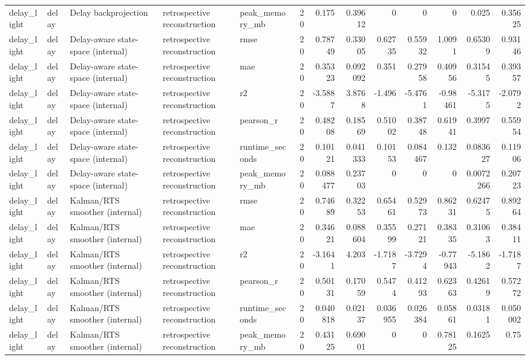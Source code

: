 \begin{table}[!htbp]
{{\begin{tabular}{lllllrrrrrrrr}
delay_light & delay & Delay backprojection & retrospective reconstruction & peak_memory_mb & 20 & 0.175 & 0.39612 & 0 & 0 & 0 & 0.025 & 0.35625 \\
delay_light & delay & Delay-aware state-space (internal) & retrospective reconstruction & rmse & 20 & 0.78749 & 0.33005 & 0.62735 & 0.55932 & 1.0091 & 0.65309 & 0.93146 \\
delay_light & delay & Delay-aware state-space (internal) & retrospective reconstruction & mae & 20 & 0.35323 & 0.092092 & 0.351 & 0.27958 & 0.40956 & 0.31545 & 0.39357 \\
delay_light & delay & Delay-aware state-space (internal) & retrospective reconstruction & r2 & 20 & -3.5887 & 3.8768 & -1.496 & -5.4761 & -0.98461 & -5.3175 & -2.0792 \\
delay_light & delay & Delay-aware state-space (internal) & retrospective reconstruction & pearson_r & 20 & 0.48208 & 0.18569 & 0.51002 & 0.38748 & 0.61941 & 0.3997 & 0.55954 \\
delay_light & delay & Delay-aware state-space (internal) & retrospective reconstruction & runtime_seconds & 20 & 0.10121 & 0.041333 & 0.10153 & 0.084467 & 0.132 & 0.083627 & 0.11906 \\
delay_light & delay & Delay-aware state-space (internal) & retrospective reconstruction & peak_memory_mb & 20 & 0.088477 & 0.23703 & 0 & 0 & 0 & 0.0072266 & 0.20723 \\
delay_light & delay & Kalman/RTS smoother (internal) & retrospective reconstruction & rmse & 20 & 0.74689 & 0.32253 & 0.65461 & 0.52973 & 0.86231 & 0.62475 & 0.89264 \\
delay_light & delay & Kalman/RTS smoother (internal) & retrospective reconstruction & mae & 20 & 0.34621 & 0.088604 & 0.35599 & 0.27121 & 0.38335 & 0.31063 & 0.38411 \\
delay_light & delay & Kalman/RTS smoother (internal) & retrospective reconstruction & r2 & 20 & -3.1641 & 4.203 & -1.7187 & -3.7294 & -0.77943 & -5.1862 & -1.7187 \\
delay_light & delay & Kalman/RTS smoother (internal) & retrospective reconstruction & pearson_r & 20 & 0.50131 & 0.17059 & 0.5474 & 0.41293 & 0.62363 & 0.42619 & 0.57272 \\
delay_light & delay & Kalman/RTS smoother (internal) & retrospective reconstruction & runtime_seconds & 20 & 0.040818 & 0.02137 & 0.036955 & 0.026384 & 0.05861 & 0.03181 & 0.050002 \\
delay_light & delay & Kalman/RTS smoother (internal) & retrospective reconstruction & peak_memory_mb & 20 & 0.43125 & 0.69001 & 0 & 0 & 0.78125 & 0.1625 & 0.75 \\

\end{tabular}}}
\end{table}
